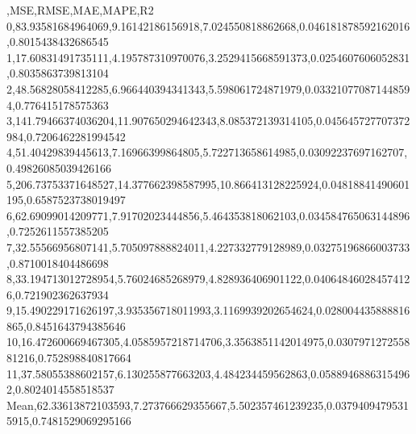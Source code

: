 ,MSE,RMSE,MAE,MAPE,R2
0,83.93581684964069,9.16142186156918,7.024550818862668,0.046181878592162016,0.8015438432686545
1,17.60831491735111,4.195787310970076,3.2529415668591373,0.0254607606052831,0.8035863739813104
2,48.56828058412285,6.966440394341343,5.598061724871979,0.033210770871448594,0.776415178575363
3,141.79466374036204,11.907650294642343,8.085372139314105,0.045645727707372984,0.7206462281994542
4,51.40429839445613,7.16966399864805,5.722713658614985,0.03092237697162707,0.49826085039426166
5,206.73753371648527,14.377662398587995,10.866413128225924,0.04818841490601195,0.6587523738019497
6,62.69099014209771,7.91702023444856,5.464353818062103,0.034584765063144896,0.7252611557385205
7,32.55566956807141,5.705097888824011,4.227332779128989,0.03275196866003733,0.8710018404486698
8,33.194713012728954,5.76024685268979,4.828936406901122,0.040648460284574126,0.721902362637934
9,15.490229171626197,3.935356718011993,3.1169939202654624,0.028004435888816865,0.8451643794385646
10,16.472600669467305,4.0585957218714706,3.3563851142014975,0.030797127255881216,0.752898840817664
11,37.58055388602157,6.130255877663203,4.484234459562863,0.05889468863154962,0.8024014558518537
Mean,62.33613872103593,7.273766629355667,5.502357461239235,0.03794094795315915,0.7481529069295166
